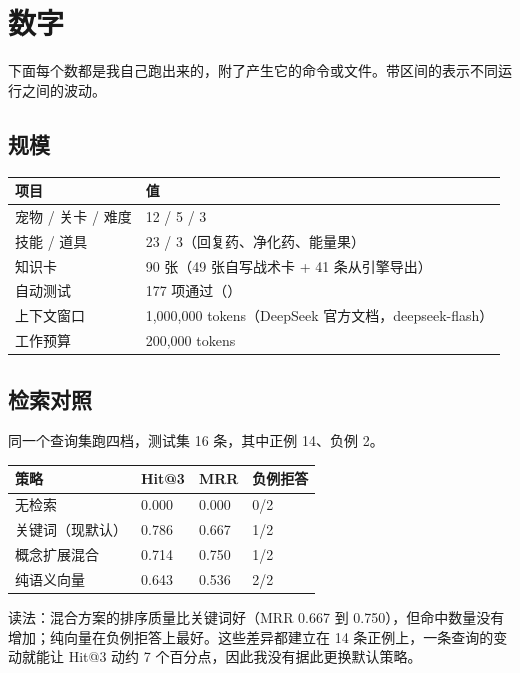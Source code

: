 \section{数字}

下面每个数都是我自己跑出来的，附了产生它的命令或文件。带区间的表示不同运行之间的波动。

\subsection{规模}

\begin{table}[h]
\centering
\small
\begin{tabular}{L{5cm}L{8.5cm}}
\toprule
项目 & 值 \\
\midrule
宠物 / 关卡 / 难度 & 12 / 5 / 3 \\
技能 / 道具 & 23 / 3（回复药、净化药、能量果） \\
知识卡 & 90 张（49 张自写战术卡 + 41 条从引擎导出） \\
自动测试 & 177 项通过（） \\
上下文窗口 & 1{,}000{,}000 tokens（DeepSeek 官方文档，deepseek-flash） \\
工作预算 & 200{,}000 tokens \\
\bottomrule
\end{tabular}
\end{table}

\subsection{检索对照}

同一个查询集跑四档，测试集 16 条，其中正例 14、负例 2。

\begin{table}[h]
\centering
\small
\begin{tabular}{L{4cm}L{3cm}L{3cm}L{3cm}}
\toprule
策略 & Hit@3 & MRR & 负例拒答 \\
\midrule
无检索 & 0.000 & 0.000 & 0/2 \\
关键词（现默认） & 0.786 & 0.667 & 1/2 \\
概念扩展混合 & 0.714 & 0.750 & 1/2 \\
纯语义向量 & 0.643 & 0.536 & 2/2 \\
\bottomrule
\end{tabular}
\end{table}

读法：混合方案的排序质量比关键词好（MRR 0.667 到 0.750），但命中数量没有增加；纯向量在负例拒答上最好。这些差异都建立在 14 条正例上，一条查询的变动就能让 Hit@3 动约 7 个百分点，因此我没有据此更换默认策略。

